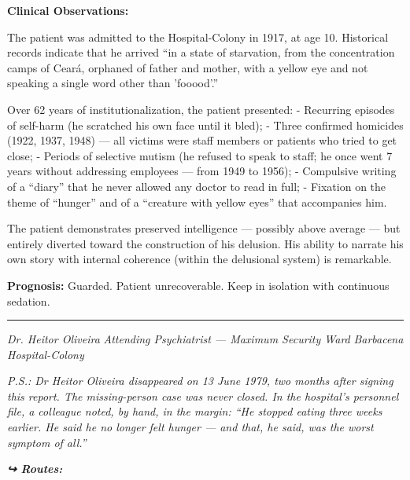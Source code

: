 \noindent \textbf{Clinical Observations:}

\noindent The patient was admitted to the Hospital-Colony in 1917, at age 10. Historical records indicate that he arrived \textquotedblleft{}in a state of starvation, from the concentration camps of Ceará, orphaned of father and mother, with a yellow eye and not speaking a single word other than 'fooood'.\textquotedblright{}

\noindent Over 62 years of institutionalization, the patient presented:
- Recurring episodes of self-harm (he scratched his own face until it bled);
- Three confirmed homicides (1922, 1937, 1948) --- all victims were staff members or patients who tried to get close;
- Periods of selective mutism (he refused to speak to staff; he once went 7 years without addressing employees --- from 1949 to 1956);
- Compulsive writing of a \textquotedblleft{}diary\textquotedblright{} that he never allowed any doctor to read in full;
- Fixation on the theme of \textquotedblleft{}hunger\textquotedblright{} and of a \textquotedblleft{}creature with yellow eyes\textquotedblright{} that accompanies him.

\noindent The patient demonstrates preserved intelligence --- possibly above average --- but entirely diverted toward the construction of his delusion. His ability to narrate his own story with internal coherence (within the delusional system) is remarkable.

\noindent \textbf{Prognosis:} Guarded. Patient unrecoverable. Keep in isolation with continuous sedation.

\vspace{0.5em}\noindent\rule{\textwidth}{0.5pt}\vspace{0.5em}

\noindent \textit{Dr. Heitor Oliveira}
\textit{Attending Psychiatrist --- Maximum Security Ward}
\textit{Barbacena Hospital-Colony}

\vspace{0.5em}
\noindent \textit{P.S.: Dr Heitor Oliveira disappeared on 13 June 1979, two months after signing this report. The missing-person case was never closed. In the hospital's personnel file, a colleague noted, by hand, in the margin: \textquotedblleft{}He stopped eating three weeks earlier. He said he no longer felt hunger --- and that, he said, was the worst symptom of all.\textquotedblright{}}

\noindent\textit{\textbf{↪ Routes:}  \rotasep {}}
